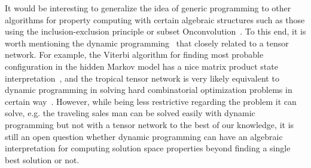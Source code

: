 \documentclass[onefignum, onetabnum]{siamart190516}
\newcommand{\<}{\langle}
\renewcommand{\>}{\rangle}
\newcounter{example}
\begin{document}

It would be interesting to generalize the idea of generic programming to other algorithms for property computing with certain algebraic structures such as those using the inclusion-exclusion principle or subset Onconvolution~\cite{Fomin2013}.
To this end, it is worth mentioning the dynamic programming~\cite{Courcelle1990, Fomin2013} that closely related to a tensor network.
For example, the Viterbi algorithm for finding most probable configuration in the hidden Markov model has a nice matrix product state interpretation~\cite{Han2018}, and the tropical tensor network is very likely equivalent to dynamic programming in solving hard combinatorial optimization problems in certain way~\cite{Liu2021}.
However, while being less restrictive regarding the problem it can solve, e.g. the traveling sales man can be solved easily with dynamic programming but not with a tensor network to the best of our knowledge, it is still an open question whether dynamic programming can have an algebraic interpretation for computing solution space properties beyond finding a single best solution or not.
\end{document}
